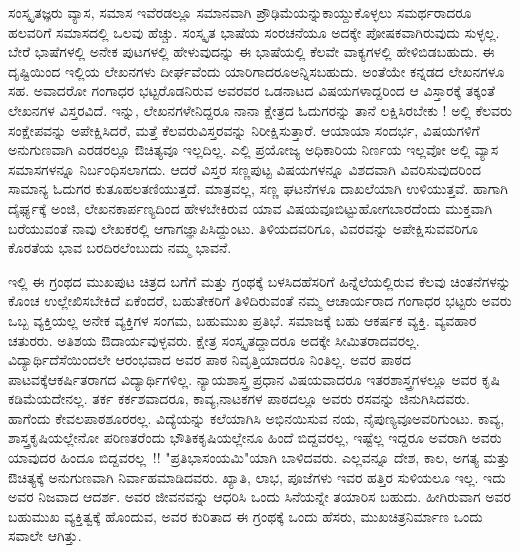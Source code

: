 {ಸಂಸ್ಕೃತಜ್ಞರು ವ್ಯಾಸ, ಸಮಾಸ ಇವೆರಡಲ್ಲೂ ಸಮಾನವಾಗಿ ಪ್ರೌಢಿಮೆಯನ್ನು\break ಕಾಯ್ದುಕೊಳ್ಳಲು ಸಮರ್ಥರಾದರೂ ಹಲವರಿಗೆ ಸಮಾಸದಲ್ಲಿ ಒಲವು ಹೆಚ್ಚು. ಸಂಸ್ಕೃತ ಭಾಷೆಯ ಸಂರಚನೆಯೂ ಅದಕ್ಕೇ  ಪೋಷಕವಾಗಿರುವುದು ಸುಳ್ಳಲ್ಲ. ಬೇರೆ ಭಾಷೆಗಳಲ್ಲಿ ಅನೇಕ ಪುಟಗಳಲ್ಲಿ ಹೇಳುವುದನ್ನು ಈ ಭಾಷೆಯಲ್ಲಿ ಕೆಲವೇ ವಾಕ್ಯಗಳಲ್ಲಿ ಹೇಳಿಬಿಡಬಹುದು. ಈ ದೃಷ್ಟಿಯಿಂದ ಇಲ್ಲಿಯ ಲೇಖನಗಳು ದೀರ್ಘವೆಂದು ಯಾರಿಗಾದರೂ\break ಅನ್ನಿಸಬಹುದು. ಅಂತೆಯೇ ಕನ್ನಡದ ಲೇಖನಗಳೂ ಸಹ. ಅವಾದರೋ ಗಂಗಾಧರ ಭಟ್ಟರೊಡನಿರುವ ಅವರವರ ಒಡನಾಟದ ವಿಷಯಗಳಾದ್ದರಿಂದ ಆ ವಿಸ್ತಾರಕ್ಕೆ ತಕ್ಕಂತೆ ಲೇಖನಗಳ ವಿಸ್ತರವಿದೆ. ಇನ್ನು, ಲೇಖನಗಳೇನಿದ್ದರೂ ನಾನಾ ಕ್ಷೇತ್ರದ ಓದುಗ\-ರನ್ನು ತಾನೆ ಲಕ್ಷಿಸಿರಬೇಕು ! ಅಲ್ಲಿ ಕೆಲವರು ಸಂಕ್ಷೇಪವನ್ನು ಅಪೇಕ್ಷಿಸಿದರೆ, ಮತ್ತೆ ಕೆಲವರು\break ವಿಸ್ತರವನ್ನು ನಿರೀಕ್ಷಿಸುತ್ತಾರೆ. ಆಯಾಯಾ ಸಂದರ್ಭ, ವಿಷಯಗಳಿಗೆ ಅನುಗುಣವಾಗಿ ಎರಡರಲ್ಲೂ ಔಚಿತ್ಯವೂ ಇಲ್ಲದಿಲ್ಲ. ಎಲ್ಲಿ ಪ್ರಯೋಜ್ಯ ಅಧಿಕಾರಿಯ ನಿರ್ಣಯ ಇಲ್ಲವೋ ಅಲ್ಲಿ ವ್ಯಾಸ ಸಮಾಸಗಳನ್ನೂ ನಿರ್ಬಂಧಿಸಲಾಗದು. ಆದರೆ ವಿಸ್ತರ ಸಣ್ಣ\-ಪುಟ್ಟ ವಿಷಯಗಳನ್ನೂ ವಿಶದವಾಗಿ ವಿವರಿಸುವುದರಿಂದ ಸಾಮಾನ್ಯ ಓದುಗರ ಕುತೂಹಲ\break ತಣಿಯುತ್ತದೆ. ಮಾತ್ರವಲ್ಲ, ಸಣ್ಣ ಘಟನೆಗಳೂ ದಾಖಲೆಯಾಗಿ ಉಳಿಯುತ್ತ\-ವೆ. ಹಾಗಾಗಿ ದೈರ್ಘ್ಯಕ್ಕೆ ಅಂಜಿ, ಲೇಖನಕಾರ್ಪಣ್ಯದಿಂದ ಹೇಳಬೇಕಿರುವ ಯಾವ ವಿಷಯವೂ\break ಬಿಟ್ಟುಹೋಗಬಾರದೆಂದು ಮುಕ್ತವಾಗಿ ಬರೆಯುವಂತೆ ನಾವು  ಲೇಖಕರಲ್ಲಿ ಆಗಾಗ\break ಜ್ಞಾಪಿಸಿದ್ದುಂಟು. ತಿಳಿಯದವರಿಗೂ, ವಿವರವನ್ನು ಅಪೇಕ್ಷಿಸುವವರಿಗೂ ಕೊರತೆಯ ಭಾವ ಬರದಿರಲೆಂಬುದು ನಮ್ಮ ಭಾವನೆ.


ಇಲ್ಲಿ ಈ ಗ್ರಂಥದ ಮುಖಪುಟ ಚಿತ್ರದ ಬಗೆಗೆ ಮತ್ತು ಗ್ರಂಥಕ್ಕೆ ಬಳಸಿದ\break ಹೆಸರಿಗೆ ಹಿನ್ನೆಲೆಯಲ್ಲಿರುವ ಕೆಲವು ಚಿಂತನೆಗಳನ್ನು ಕೊಂಚ ಉಲ್ಲೇಖಿಸಬೇಕಿದೆ \enginline{-} ಏಕೆಂದರೆ, ಬಹುತೇಕರಿಗೆ ತಿಳಿದಿರುವಂತೆ ನಮ್ಮ ಆಚಾರ್ಯರಾದ ಗಂಗಾಧರ ಭಟ್ಟರು \enginline{-} ಅವರು ಒಬ್ಬ ವ್ಯಕ್ತಿಯಲ್ಲ \enginline{-} ಅನೇಕ ವ್ಯಕ್ತಿಗಳ ಸಂಗಮ, ಬಹುಮುಖ ಪ್ರತಿಭೆ. ಸಮಾಜಕ್ಕೆ ಬಹು ಆಕರ್ಷಕ ವ್ಯಕ್ತಿ. ವ್ಯವಹಾರ ಚತುರರು. ಅತಿಶಯ \hbox{ಔದಾರ್ಯವುಳ್ಳವರು.} ಕ್ಷೇತ್ರ ಸಂಸ್ಕೃತದ್ದಾದರೂ ಅದಕ್ಕೇ ಸೀಮಿತರಾದವರಲ್ಲ. ವಿದ್ಯಾರ್ಥಿದೆಸೆಯಿಂದಲೇ ಆರಂಭವಾದ ಅವರ ಪಾಠ ನಿವೃತ್ತಿಯಾದರೂ ನಿಂತಿಲ್ಲ. ಅವರ ಪಾಠದ ಪಾಟವಕ್ಕೆ\break ಆಕರ್ಷಿತರಾಗದ ವಿದ್ಯಾರ್ಥಿಗಳಿಲ್ಲ. ನ್ಯಾಯಶಾಸ್ತ್ರ ಪ್ರಧಾನ ವಿಷಯವಾದರೂ ಇತರ\break ಶಾಸ್ತ್ರಗಳಲ್ಲೂ ಅವರ ಕೃಷಿ ಕಡಿಮೆಯದೇನಲ್ಲ. ತರ್ಕ ಕರ್ಕಶವಾದರೂ, ಕಾವ್ಯ,\break ನಾಟಕಗಳ ಪಾಠದಲ್ಲೂ ಅವರು ರಸವನ್ನು ಜಿನುಗಿಸಿದವರು. ಹಾಗೆಂದು ಕೇವಲ\break ಪಾಠಶೂರರಲ್ಲ. ವಿದ್ಯೆಯನ್ನು  ಕಲೆಯಾಗಿಸಿ ಅಭಿನಯಿಸುವ ನಯ, ನೈಪುಣ್ಯವೂ\break ಅವರಿಗುಂಟು. ಕಾವ್ಯ, ಶಾಸ್ತ್ರಕೃಷಿಯಲ್ಲೇನೋ ಪರಿಣತರೆಂದು \hbox{ಭೌತಿಕಕೃಷಿಯಲ್ಲೇನೂ} ಹಿಂದೆ ಬಿದ್ದವರಲ್ಲ, ಇಷ್ಟೆಲ್ಲ ಇದ್ದರೂ ಅವರಾಗಿ ಅವರು ಯಾವುದರ ಹಿಂದೂ ಬಿದ್ದವರಲ್ಲ~!! "ಪ್ರತಿಭಾಸಂಯಮಿ"ಯಾಗಿ ಬಾಳಿದವರು. ಎಲ್ಲವನ್ನೂ ದೇಶ, ಕಾಲ, ಅಗತ್ಯ ಮತ್ತು ಔಚಿತ್ಯಕ್ಕೆ ಅನುಗುಣವಾಗಿ ನಿರ್ವಾಹ\-ಮಾಡಿದವರು. ಖ್ಯಾತಿ, ಲಾಭ, \hbox{ಪೂಜೆಗಳು} ಇವರ ಹತ್ತಿರ ಸುಳಿಯಲೂ ಇಲ್ಲ.  ಇದು ಅವರ ನಿಜವಾದ ಆದರ್ಶ. ಅವರ ಜೀವನವನ್ನು ಆಧರಿಸಿ ಒಂದು ಸಿನೆಯನ್ನೇ ತಯಾರಿಸ\- ಬಹುದು. ಹೀಗಿರುವಾಗ ಅವರ ಬಹುಮುಖ ವ್ಯಕ್ತಿತ್ವಕ್ಕೆ ಹೊಂದುವ, ಅವರ ಕುರಿತಾದ ಈ ಗ್ರಂಥಕ್ಕೆ ಒಂದು ಹೆಸರು, ಮುಖಚಿತ್ರನಿರ್ಮಾಣ ಒಂದು ಸವಾಲೇ ಆಗಿತ್ತು.


}

